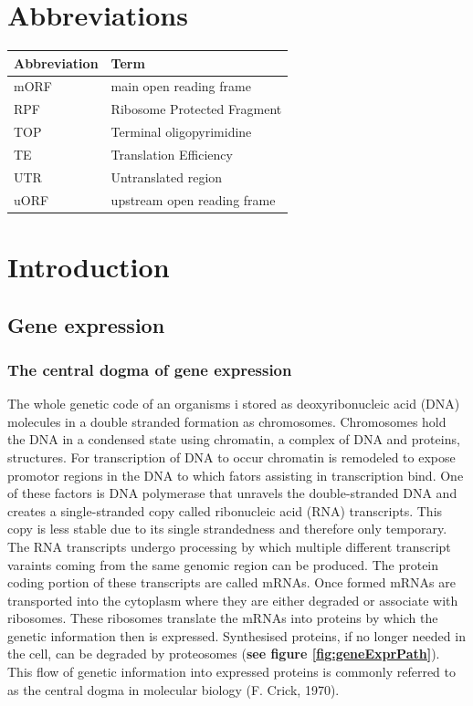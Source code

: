 \documentclass[12pt,openany]{book}
\author{}
\date{\vspace{-2.5em}}
\begin{document}
{
\setcounter{tocdepth}{4}
\tableofcontents
}
\cleardoublepage
\pagestyle{fancy} \fancyhf{} \renewcommand{\headrulewidth}{0pt}
\fancyfoot[LE,RO]{\thepage} \renewcommand{\floatpagefraction}{.9}
\setcounter{page}{9}

\chapter*{Abbreviations}\label{abbreviations}

\begin{tabular}{ll}
\toprule
Abbreviation & Term\\
\midrule
mORF & main open reading frame\\
RPF & Ribosome Protected Fragment\\
TOP & Terminal oligopyrimidine\\
TE & Translation Efficiency\\
UTR & Untranslated region\\
uORF & upstream open reading frame\\
\bottomrule
\end{tabular}

\chapter{Introduction}

\section{Gene expression}\subsection{The central dogma of gene expression}

The whole genetic code of an organisms i stored as deoxyribonucleic acid
(DNA) molecules in a double stranded formation as chromosomes.
Chromosomes hold the DNA in a condensed state using chromatin, a complex
of DNA and proteins, structures. For transcription of DNA to occur
chromatin is remodeled to expose promotor regions in the DNA to which
fators assisting in transcription bind. One of these factors is DNA
polymerase that unravels the double-stranded DNA and creates a
single-stranded copy called ribonucleic acid (RNA) transcripts. This
copy is less stable due to its single strandedness and therefore only
temporary. The RNA transcripts undergo processing by which multiple
different transcript varaints coming from the same genomic region can be
produced. The protein coding portion of these transcripts are called
mRNAs. Once formed mRNAs are transported into the cytoplasm where they
are either degraded or associate with ribosomes. These ribosomes
translate the mRNAs into proteins by which the genetic information then
is expressed. Synthesised proteins, if no longer needed in the cell, can
be degraded by proteosomes (\textbf{see figure \ref{fig:geneExprPath}}).
This flow of genetic information into expressed proteins is commonly
referred to as the central dogma in molecular biology (F. Crick, 1970).
\end{document}
